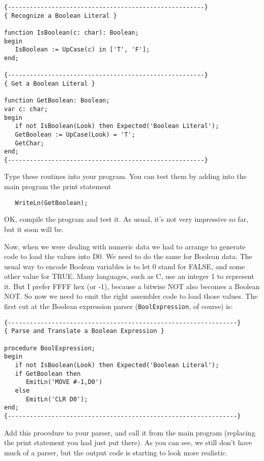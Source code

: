\begin{verbatim}
{------------------------------------------------------}
{ Recognize a Boolean Literal }

function IsBoolean(c: char): Boolean;
begin
   IsBoolean := UpCase(c) in ['T', 'F'];
end;

{------------------------------------------------------}
{ Get a Boolean Literal }

function GetBoolean: Boolean;
var c: char;
begin
   if not IsBoolean(Look) then Expected('Boolean Literal');
   GetBoolean := UpCase(Look) = 'T';
   GetChar;
end;
{------------------------------------------------------}
\end{verbatim}

Type  these routines into your program. You  can  test  them  by
adding into the main program the print statement

\begin{verbatim}
   WriteLn(GetBoolean);
\end{verbatim}

OK, compile the program and test it. As  usual, it's  not very impressive so far, but it soon will be.

Now, when we were dealing with numeric data we had to  arrange to generate code to load the values into D0. We need to do the same for Boolean data. The  usual way to encode Boolean variables is to let 0 stand for FALSE, and  some  other value for TRUE. Many languages, such as C, use an  integer  1  to represent it. But I prefer FFFF hex  (or -1), because  a bitwise NOT also becomes a Boolean  NOT. So now we need to emit the right assembler code to load  those  values. The  first cut at the Boolean  expression parser ({\tt BoolExpression}, of course) is:

\begin{verbatim}
{---------------------------------------------------------------}
{ Parse and Translate a Boolean Expression }

procedure BoolExpression;
begin
   if not IsBoolean(Look) then Expected('Boolean Literal');
   if GetBoolean then
      EmitLn('MOVE #-1,D0')
   else
      EmitLn('CLR D0');
end;
{---------------------------------------------------------------}
\end{verbatim}

Add  this procedure to your parser, and call  it  from  the  main program (replacing the  print  statement you had just put there). As you  can  see, we  still don't have much of a parser, but the output code is starting to look more realistic.

